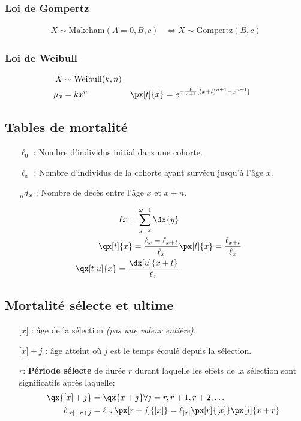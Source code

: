 \documentclass[10pt, french]{article}
\begin{document}
\begin{multicols*}{3}
\subsubsection*{Loi de Gompertz}
\begin{align*}
	X \sim \text{Makeham}(A = 0, B, c) &\Leftrightarrow X \sim \text{Gompertz}(B, c) 
\end{align*}

\subsubsection*{Loi de Weibull}
\begin{align*}
	X &\sim \text{Weibull}(k, n) \\
	\mu_x &= k x^n	&
	\px[t]{x} &= e^{-\frac{k}{n + 1}[(x + t)^{n + 1} - x^{n + 1}]}
\end{align*}


\subsection{Tables de mortalité}
\begin{itemize}
\item[$\ell_0$ : ] Nombre d'individus initial dans une cohorte.
\item[$\ell_x$ : ] Nombre d'individus de la cohorte ayant survécu jusqu'à l'âge $x$.
\item[$\prescript{}{n}d_{x}$ : ] Nombre de décès entre l'âge $x$ et $x+n$.

\begin{align*}
\ell{x} = \sum_{y = x}^{\omega - 1} \dx{y} \\
\qx[t]{x} = \frac{\ell_x - \ell_{x+t}}{\ell_x} &
\px[t]{x} = \frac{\ell_{x+t}}{\ell_x} \\
\qx[t|u]{x} = \frac{\dx[u]{x+t}}{\ell_x}
\end{align*}


\end{itemize}


\subsection{Mortalité sélecte et ultime}
\begin{itemize}
\item[${[}x{]}$ : ] âge de la sélection \textit{(pas une valeur entière)}.
\item[${[}x{]} + j$ : ] âge atteint où $j$ est le temps écoulé depuis la sélection.
\item[$r$: ] \textbf{Période sélecte} de durée $r$ durant laquelle les effets de la sélection sont significatifs après laquelle:
\begin{align*}
	\qx{[x] + j} &= \qx{x + j} \forall j = r, r + 1, r + 2, \dots \\
	\ell_{[x] + r + j} &= \ell_{[x]} \px[r + j]{[x]} = \ell_{[x]} \px[r]{[x]} \px[j]{x + r}
\end{align*}
\end{itemize}


\end{multicols*}
\end{document}
